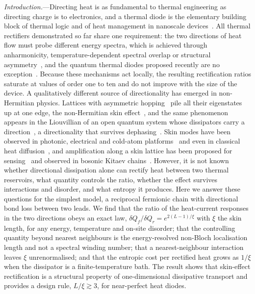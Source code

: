 \documentclass[reprint,aps,prl,superscriptaddress,nofootinbib,floatfix]{revtex4-2}
\newcommand{\dQ}{\delta Q}
\begin{document}
\textit{Introduction.}---Directing heat is as fundamental to thermal engineering as directing charge is to electronics, and a thermal diode is the elementary building block of thermal logic and of heat management in nanoscale devices~\cite{Terraneo2002,Li2004,Chang2006,Li2012,Benenti2017}.
All thermal rectifiers demonstrated so far share one requirement: the two directions of heat flow must probe different energy spectra, which is achieved through anharmonicity, temperature-dependent spectral overlap or structural asymmetry~\cite{Segal2005,Li2012}, and the quantum thermal diodes proposed recently are no exception~\cite{Zhang2025}.
Because these mechanisms act locally, the resulting rectification ratios saturate at values of order one to ten and do not improve with the size of the device.
A qualitatively different source of directionality has emerged in non-Hermitian physics.
Lattices with asymmetric hopping~\cite{Hatano1996} pile all their eigenstates up at one edge, the non-Hermitian skin effect~\cite{Yao2018,Gong2018,Lee2019,Okuma2020,Bergholtz2021}, and the same phenomenon appears in the Liouvillian of an open quantum system whose dissipators carry a direction~\cite{Song2019,Haga2021,Metelmann2015,Rassaert2025,Shigedomi2026}, a directionality that survives dephasing~\cite{Wang2026}.
Skin modes have been observed in photonic, electrical and cold-atom platforms~\cite{Weidemann2020,Helbig2020,Xiao2020,Liang2022,Zhou2025} and even in classical heat diffusion~\cite{Cao2021,Liu2024}, and amplification along a skin lattice has been proposed for sensing~\cite{McDonald2020} and observed in bosonic Kitaev chains~\cite{Busnaina2024,Slim2024}.
However, it is not known whether directional dissipation alone can rectify heat between two thermal reservoirs, what quantity controls the ratio, whether the effect survives interactions and disorder, and what entropy it produces.
Here we answer these questions for the simplest model, a reciprocal fermionic chain with directional bond loss between two leads.
We find that the ratio of the heat-current responses in the two directions obeys an exact law, $\dQ_f/\dQ_r=e^{2(L-1)/\xi}$ with $\xi$ the skin length, for any energy, temperature and on-site disorder; that the controlling quantity beyond nearest neighbours is the energy-resolved non-Bloch localisation length and not a spectral winding number; that a nearest-neighbour interaction leaves $\xi$ unrenormalised; and that the entropic cost per rectified heat grows as $1/\xi$ when the dissipator is a finite-temperature bath.
The result shows that skin-effect rectification is a structural property of one-dimensional dissipative transport and provides a design rule, $L/\xi\gtrsim3$, for near-perfect heat diodes.
\end{document}
